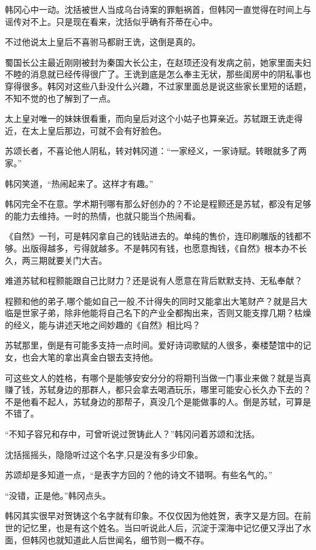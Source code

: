 韩冈心中一动。沈括被世人当成乌台诗案的罪魁祸首，但韩冈一直觉得在时间上与谣传对不上。只是现在看来，沈括似乎确有芥蒂在心中。

不过他说太上皇后不喜驸马都尉王诜，这倒是真的。

蜀国长公主最近刚刚被封为秦国大长公主，在赵顼还没有发病之前，她家里面夫妇不睦的消息就已经传得很广了。王诜到底是怎么奉主无状，那些闺房中的阴私事也穿得很多。韩冈对这些八卦没什么兴趣，不过家里面总是说这些家长里短的话题，不知不觉的也了解到了一点。

太上皇对唯一的妹妹很看重，而向皇后对这个小姑子也算亲近。苏轼跟王诜走得近，在太上皇后那边，可就不会有好脸色。

苏颂长者，不喜论他人阴私，转对韩冈道：“一家经义，一家诗赋。转眼就多了两家。”

韩冈笑道，“热闹起来了。这样才有趣。”

韩冈完全不在意。学术期刊哪有那么好创办的？不论是程颢还是苏轼，都没有足够的能力去维持。一时的热情，也就只能当个热闹看。

《自然》一刊，可是韩冈拿自己的钱贴进去的。单纯的售价，连印刷雕版的钱都不够。出版得越多，亏得就越多。不是韩冈有钱，也愿意掏钱，《自然》根本办不长久，两三期就要关门大吉。

难道苏轼和程颢能跟自己比财力？还是说有人愿意在背后默默支持、无私奉献？

程颢和他的弟子,哪个能如自己一般,不计得失的同时又能拿出大笔财产？就是吕大临是世家子弟，除非他能将自己名下的产业全都掏出来，否则又能支撑几期？枯燥的经义，能与讲述天地之间妙趣的《自然》相比吗？

苏轼那里，倒是有可能多支持一点时间。爱好诗词歌赋的人很多，秦楼楚馆中的记女，也会大笔的拿出真金白银去支持他。

可这些文人的姓格，有哪个是能够安安分分的将期刊当做一门事业来做？就是当真赚了钱，苏轼身边的那群人，都只会拿去喝酒玩乐，哪里可能安心长久办下去的？不是他看不起人，苏轼身边的那帮子，真没几个是能做事的人。倒是苏轼，可算是不错了。

“不知子容兄和存中，可曾听说过贺铸此人？”韩冈问着苏颂和沈括。

沈括摇摇头，隐隐听过这个名字,只是没有多少印象。

苏颂却是多知道一点，“是表字方回的？他的诗文不错啊。有些名气的。”

“没错，正是他。”韩冈点头。

韩冈其实很早对贺铸这个名字就有印象。不仅仅因为他姓贺，表字又是方回。在前世的记忆里，也是有这个姓名。当曰听说此人后，沉淀于深海中记忆便又浮出了水面，但韩冈也就知道此人后世闻名，细节则一概不存。

